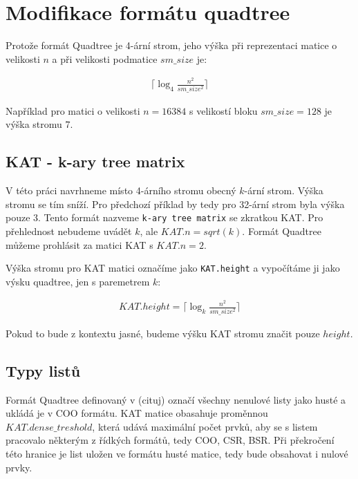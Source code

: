 
\label{katchapter}
\chapter{Modifikace formátu quadtree}

Protože formát Quadtree je 4-ární strom, jeho výška při reprezentaci matice o velikosti $n$ a při velikosti podmatice $sm\_size$ je:

%

\label{quadtreeheight}
\begin{align}
\Bigg\lceil\log_{4}\frac{n^2}{sm\_size^2}\Bigg\rceil
\end{align}

Například pro matici o velikosti $n=16384$ s velikostí bloku $sm\_size=128$ je výška stromu $7$.

\section{KAT - k-ary tree matrix}

V této práci navrhneme místo 4-árního stromu obecný $k$-ární strom. Výška stromu se tím sníží. Pro předchozí příklad by tedy pro 32-ární strom byla výška pouze $3$. Tento formát nazveme \texttt{k-ary tree matrix} se zkratkou KAT. Pro přehlednost nebudeme uvádět $k$, ale $KAT.n = sqrt(k)$. Formát Quadtree můžeme prohlásit za matici KAT s $KAT.n = 2$.

Výška stromu pro KAT matici označíme jako \texttt{KAT.height} a vypočítáme ji jako výsku quadtree, jen s paremetrem $k$:

\label{katheight}
\begin{align}
KAT.height = \Bigg\lceil\log_{k}\frac{n^2}{sm\_size^2}\Bigg\rceil
\end{align}

Pokud to bude z kontextu jasné, budeme výšku KAT stromu značit pouze $height$.

\section{Typy listů}

Formát Quadtree definovaný v (cituj) označí všechny nenulové listy jako husté a ukládá je v COO formátu. KAT matice obasahuje proměnnou $KAT.dense\_treshold$, která udává maximální počet prvků, aby se s listem pracovalo některým z řídkých formátů, tedy COO, CSR, BSR. Při překročení této hranice je list uložen ve formátu husté matice, tedy bude obsahovat i nulové prvky.

